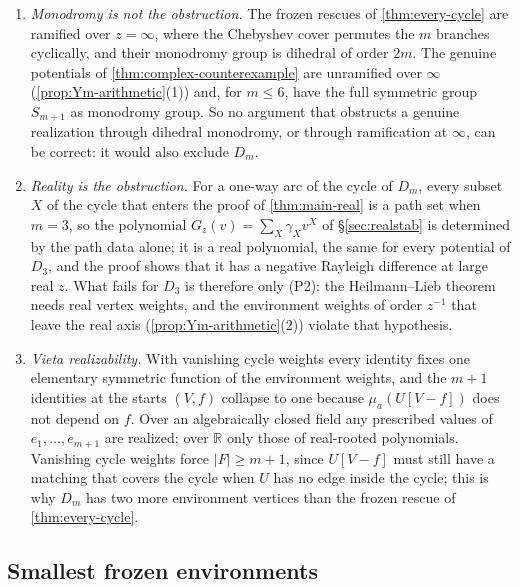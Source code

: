 \documentclass[final]{siamart0516}
\numberwithin{theorem}{section}
\numberwithin{equation}{section}
\theoremstyle{siamnonum}
\theoremstyle{plain}
\newcommand{\RR}{\mathbb{R}}
\begin{document}
\begin{remark}\label{rem:monodromy}
\begin{enumerate}[label=(\arabic*)]
\item \emph{Monodromy is not the obstruction.} The frozen rescues of \cref{thm:every-cycle} are ramified over $z=\infty$, where the Chebyshev cover permutes the $m$ branches cyclically, and their monodromy group is dihedral of order $2m$. The genuine potentials of \cref{thm:complex-counterexample} are unramified over $\infty$ (\cref{prop:Ym-arithmetic}(1)) and, for $m\le6$, have the full symmetric group $S_{m+1}$ as monodromy group. So no argument that obstructs a genuine realization through dihedral monodromy, or through ramification at $\infty$, can be correct: it would also exclude $D_m$.
\item \emph{Reality is the obstruction.} For a one-way arc of the cycle of $D_m$, every subset $X$ of the cycle that enters the proof of \cref{thm:main-real} is a path set when $m=3$, so the polynomial $G_z(v)=\sum_X\gamma_Xv^{X}$ of \S\ref{sec:realstab} is determined by the path data alone; it is a real polynomial, the same for every potential of $D_3$, and the proof shows that it has a negative Rayleigh difference at large real $z$. What fails for $D_3$ is therefore only \textup{(P2)}: the Heilmann--Lieb theorem needs real vertex weights, and the environment weights of order $z^{-1}$ that leave the real axis (\cref{prop:Ym-arithmetic}(2)) violate that hypothesis.
\item \emph{Vieta realizability.} With vanishing cycle weights every identity fixes one elementary symmetric function of the environment weights, and the $m+1$ identities at the starts $(V,f)$ collapse to one because $\mu_a(U[V-f])$ does not depend on $f$. Over an algebraically closed field any prescribed values of $e_1,\dots,e_{m+1}$ are realized; over $\RR$ only those of real-rooted polynomials. Vanishing cycle weights force $|F|\ge m+1$, since $U[V-f]$ must still have a matching that covers the cycle when $U$ has no edge inside the cycle; this is why $D_m$ has two more environment vertices than the frozen rescue of \cref{thm:every-cycle}.
\end{enumerate}
\end{remark}

\subsection{Smallest frozen environments}
\end{document}

